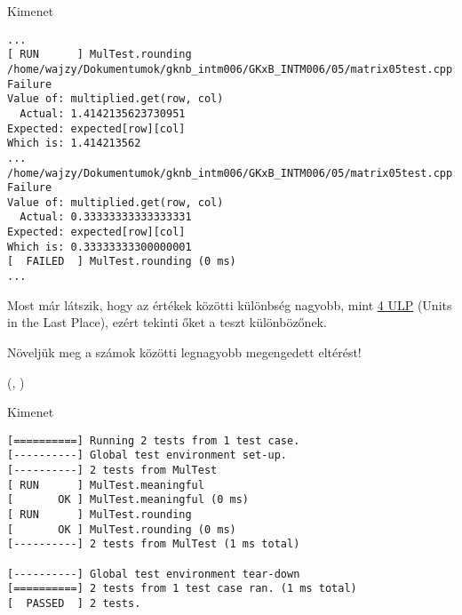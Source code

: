 \documentclass[usenames,dvipsnames,aspectratio=169]{beamer}
\newcommand{\hiv}[1]{{\color{hivatkozasszin}#1}}
\begin{document}
\begin{frame}[fragile]
  \begin{block}{Kimenet}
    \scriptsize
    \begin{verbatim}
...
[ RUN      ] MulTest.rounding
/home/wajzy/Dokumentumok/gknb_intm006/GKxB_INTM006/05/matrix05test.cpp:50: Failure
Value of: multiplied.get(row, col)
  Actual: 1.4142135623730951
Expected: expected[row][col]
Which is: 1.414213562
...
/home/wajzy/Dokumentumok/gknb_intm006/GKxB_INTM006/05/matrix05test.cpp:50: Failure
Value of: multiplied.get(row, col)
  Actual: 0.33333333333333331
Expected: expected[row][col]
Which is: 0.33333333300000001
[  FAILED  ] MulTest.rounding (0 ms)
...
\end{verbatim}
  \end{block}
  Most már látszik, hogy az értékek közötti különbség nagyobb, mint %
  \hiv{\href{https://randomascii.wordpress.com/2012/02/25/comparing-floating-point-numbers-2012-edition/}{4 ULP}} %
  (Units in the Last Place), ezért tekinti őket a teszt különbözőnek.
\end{frame}

\begin{frame}
  Növeljük meg a számok közötti legnagyobb megengedett eltérést!
  \begin{exampleblock}{ %
    (, %
     )}
    \footnotesize
    
  \end{exampleblock}
\end{frame}

\begin{frame}[fragile]
  \begin{block}{Kimenet}
    \scriptsize
    \begin{verbatim}
[==========] Running 2 tests from 1 test case.
[----------] Global test environment set-up.
[----------] 2 tests from MulTest
[ RUN      ] MulTest.meaningful
[       OK ] MulTest.meaningful (0 ms)
[ RUN      ] MulTest.rounding
[       OK ] MulTest.rounding (0 ms)
[----------] 2 tests from MulTest (1 ms total)

[----------] Global test environment tear-down
[==========] 2 tests from 1 test case ran. (1 ms total)
[  PASSED  ] 2 tests.
\end{verbatim}
  \end{block}
\end{frame}
\end{document}
